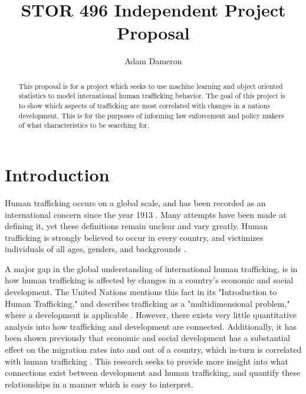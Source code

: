\documentclass{article} %
\title{STOR 496 Independent Project Proposal}
\author{
Adam Dameron
}
\begin{document}
\maketitle

\begin{abstract}
This proposal is for a project which seeks to use machine learning and object oriented statistics to model international human trafficking behavior. The goal of this project is to show which aspects of trafficking are most correlated with changes in a nations development. This is for the purposes of informing law enforcement and policy makers of what characteristics to be searching for.
\end{abstract}

\section{Introduction}
	Human trafficking occurs on a global scale, and has been recorded as an international concern since the year 1913 \parencite{Aromaa2007}. Many attempts have been made at defining it, yet these definitions remain unclear and vary greatly. Human trafficking is strongly believed to occur in every country, and victimizes individuals of all ages, genders, and backgrounds \parencite{JacK2012}.\medskip
	
	A major gap in the global understanding of international human trafficking, is in how human trafficking is affected by changes in a country's economic and social development. The United Nations mentions this fact in its "Introduction to Human Trafficking," and describes trafficking as a "multidimensional problem," where a development is applicable \parencite{kangaspunta_2008}. However, there exists very little quantitative analysis into how trafficking and development are connected. Additionally, it has been shown previously that economic and social development has a substantial effect on the migration rates into and out of a country, which in-turn is correlated with human trafficking \parencite{USEconPower, EastEurope}. This research seeks to provide more insight into what connections exist between development and human trafficking, and quantify these relationships in a manner which is easy to interpret.
	
	
\end{document}
